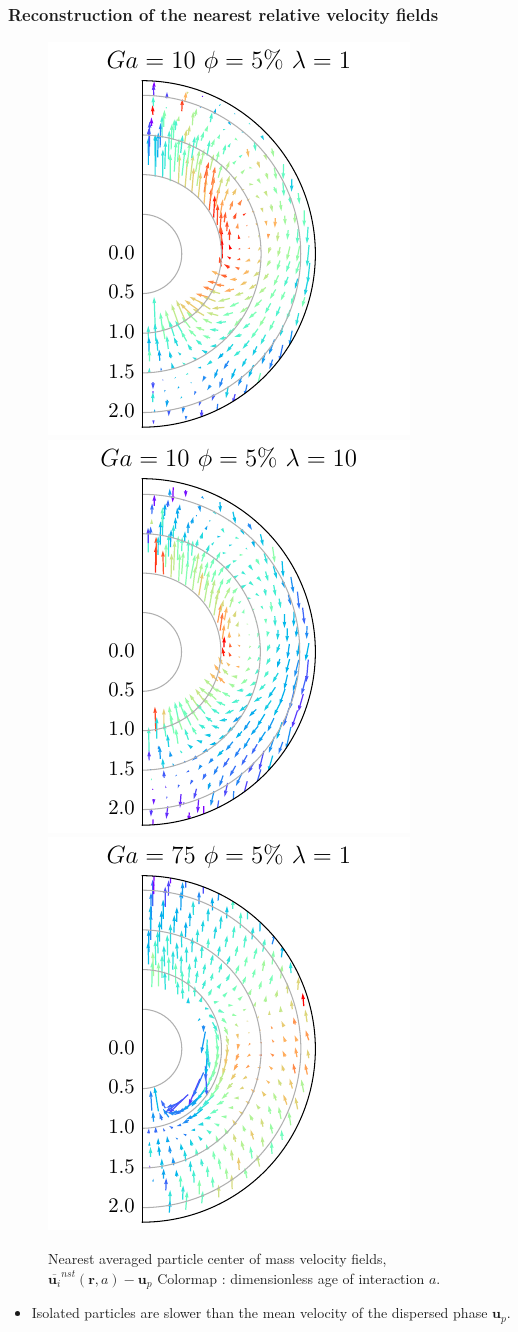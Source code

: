 \documentclass{sintefbeamer}
\newcommand{\nstavg}[1]{\overline{#1}^{nst}}
\begin{document}
\begin{frame}
  \frametitle{Reconstruction of the nearest relative velocity fields}
  \begin{figure}
    
    \includegraphics[height=0.35\textwidth]{image/HOMOGENEOUS/fDrop/U_l_1_Ga_10_PHI_5.pdf}
    \includegraphics[height=0.35\textwidth]{image/HOMOGENEOUS/fDrop/U_l_10_Ga_10_PHI_5.pdf}
    \includegraphics[height=0.35\textwidth]{image/HOMOGENEOUS/fDrop/U_l_1_Ga_75_PHI_5.pdf}
    \caption{ Nearest averaged particle center of mass velocity fields, $\nstavg{\textbf{u}_i} (\textbf{r},a) - \textbf{u}_p$
    Colormap : dimensionless age of interaction $a$. }
  \end{figure}

\begin{itemize}
  \item Isolated particles are slower than the mean velocity of the dispersed phase $\textbf{u}_p$.
\end{itemize}

\end{frame}
\end{document}
